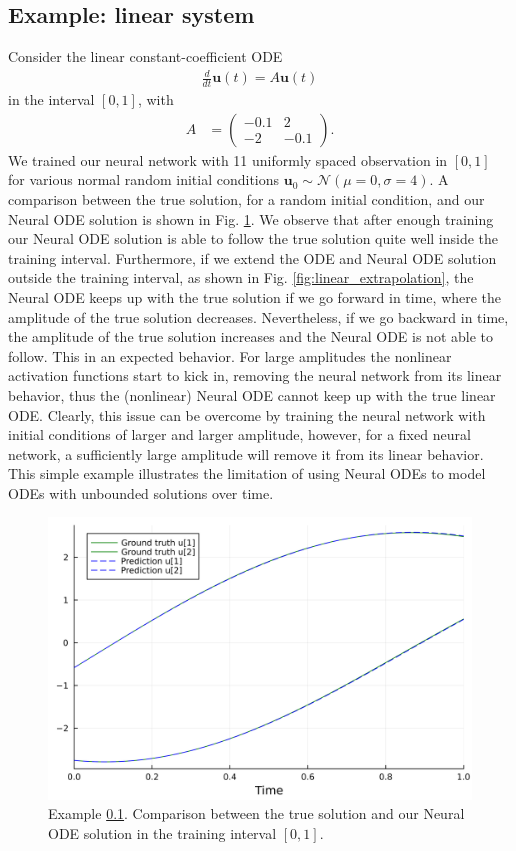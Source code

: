 \documentclass[final,onefignum,onetabnum]{siamart220329}
\newcommand{\bol}{\boldsymbol}
\newcounter{example}
\begin{document}
\subsection{Example: linear system}\label{ex:linear}
Consider the linear constant-coefficient ODE 
\begin{align}
	\frac{d}{dt}\bol{u}(t) = A\bol{u}(t) 
\end{align}
in the interval $[0,1]$, with
\begin{align}
	A &= \begin{pmatrix}
		-0.1 & 2 \\
		-2 & -0.1
	\end{pmatrix}.
\end{align}
We trained our neural network with 11 uniformly spaced observation in $[0,1]$ for various normal random initial conditions $\bol u_0 \sim \mathcal{N}(\mu=0,\sigma=4)$. A comparison between the true solution, for a random initial condition, and our Neural ODE solution is shown in Fig. \ref{fig:linear_comparison}. We observe that after enough training our Neural ODE solution is able to follow the true solution quite well inside the training interval. Furthermore, if we extend the ODE and Neural ODE solution outside the training interval, as shown in Fig. \ref{fig:linear_extrapolation}, the Neural ODE keeps up with the true solution if we go forward in time, where the amplitude of the true solution decreases. Nevertheless, if we go backward in time, the amplitude of the true solution increases and the Neural ODE is not able to follow. This in an expected behavior. For large amplitudes the nonlinear activation functions start to kick in, removing the neural network from its linear behavior, thus the (nonlinear) Neural ODE cannot keep up with the true linear ODE. Clearly, this issue can be overcome by training the neural network with initial conditions of larger and larger amplitude, however, for a fixed neural network, a sufficiently large amplitude will remove it from its linear behavior. This simple example illustrates the limitation of using Neural ODEs to model ODEs with unbounded solutions over time.

\begin{figure}[h!]
	\centering
	\includegraphics[width=0.5\linewidth]{../examples/linear/comparison}
	\caption{Example \ref{ex:linear}. Comparison between the true solution and our Neural ODE solution in the training interval $[0,1]$.}
	\label{fig:linear_comparison}
\end{figure}
\end{document}
